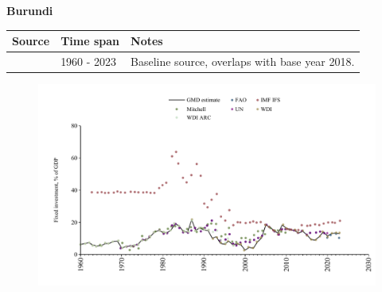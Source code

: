 \documentclass[12pt,a4paper,landscape]{article}
\begin{document}
\begin{adjustbox}{max totalsize={\paperwidth}{\paperheight},center}
\begin{minipage}[t][\textheight][t]{\textwidth}
\vspace*{0.5cm}
{}
\begin{center}
{\Large\bfseries Burundi}
\end{center}
\vspace{0.5cm}
\begin{table}[H]
\centering
\small
\begin{tabular}{|l|l|l|}
\hline
\textbf{Source} & \textbf{Time span} & \textbf{Notes} \\
\hline
\rowcolor{white}\cite{WDI}& 1960 - 2023 &Baseline source, overlaps with base year 2018.\\
\hline
\end{tabular}
\end{table}
\begin{figure}[H]
\centering
\includegraphics[width=\textwidth,height=0.6\textheight,keepaspectratio]{graphs/BDI_finv_GDP.pdf}
\end{figure}
\end{minipage}
\end{adjustbox}
\end{document}

